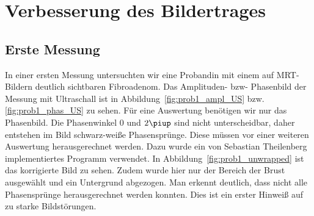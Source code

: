 \documentclass[
    11pt,
    ngerman
]{scrbook}
\begin{document}
\section{Verbesserung des Bildertrages}

\subsection{Erste Messung}

In einer ersten Messung untersuchten wir eine Probandin mit einem auf
MRT-Bildern deutlich sichtbaren Fibroadenom. Das Amplituden- bzw- Phasenbild
der Messung mit Ultraschall ist in Abbildung~\ref{fig:prob1_ampl_US} bzw.
\ref{fig:prob1_phas_US} zu sehen.  Für eine Auswertung benötigen wir nur das
Phasenbild. Die Phasenwinkel 0 und $2\piup$ sind nicht unterscheidbar, daher
entstehen im Bild schwarz-weiße Phasensprünge. Diese müssen vor einer weiteren
Auswertung herausgerechnet werden. Dazu wurde ein von Sebastian Theilenberg
implementiertes Programm verwendet. In Abbildung~\ref{fig:prob1_unwrapped} ist
das korrigierte Bild zu sehen. Zudem wurde hier nur der Bereich der Brust
ausgewählt und ein Untergrund abgezogen. Man erkennt deutlich, dass nicht alle
Phasensprünge herausgerechnet werden konnten. Dies ist ein erster Hinweiß auf
zu starke Bildstörungen.
\end{document}
